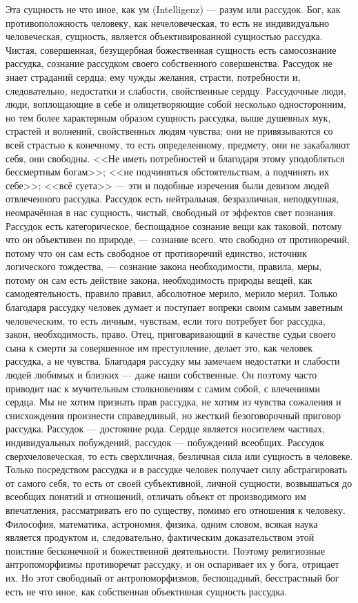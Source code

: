\documentclass[12pt,oneside]{book}
\begin{document}
Эта сущность не что иное, как ум (Intelligenz) --- разум или рассудок. Бог, как противоположность человеку, как нечеловеческая, то есть не индивидуально человеческая, сущность, является объективированной сущностью рассудка. Чистая, совершенная, безущербная божественная сущность есть самосознание рассудка, сознание рассудком своего собственного совершенства. Рассудок не знает страданий сердца; ему чужды желания, страсти, потребности и, следовательно, недостатки и слабости, свойственные сердцу. Рассудочные люди, люди, воплощающие в себе и олицетворяющие собой несколько односторонним, но тем более характерным образом сущность рассудка, выше душевных мук, страстей и волнений, свойственных людям чувства; они не привязываются со всей страстью к конечному, то есть определенному, предмету, они не закабаляют себя, они свободны. <<Не иметь потребностей и благодаря этому уподобляться бессмертным богам>>; <<не подчиняться обстоятельствам, а подчинять их себе>>; <<всё суета>> --- эти и подобные изречения были девизом людей отвлеченного рассудка. Рассудок есть нейтральная, безразличная, неподкупная, неомрачённая в нас сущность, чистый, свободный от эффектов свет познания. Рассудок есть категорическое, беспощадное сознание вещи как таковой, потому что он объективен по природе, --- сознание всего, что свободно от противоречий, потому что он сам есть свободное от противоречий единство, источник логического тождества, --- сознание закона необходимости, правила, меры, потому он сам есть действие закона, необходимость природы вещей, как самодеятельность, правило правил, абсолютное мерило, мерило мерил. Только благодаря рассудку человек думает и поступает вопреки своим самым заветным человеческим, то есть личным, чувствам, если того потребует бог рассудка, закон, необходимость, право. Отец, приговаривающий в качестве судьи своего сына к смерти за совершенное им преступление, делает это, как человек рассудка, а не чувства. Благодаря рассудку мы замечаем недостатки и слабости людей любимых и близких --- даже наши собственные. Он поэтому часто приводит нас к мучительным столкновениям с самим собой, с влечениями сердца. Мы не хотим признать прав рассудка, не хотим из чувства сожаления и снисхождения произнести справедливый, но жесткий безоговорочный приговор рассудка. Рассудок --- достояние рода. Сердце является носителем частных, индивидуальных побуждений, рассудок --- побуждений всеобщих. Рассудок сверхчеловеческая, то есть сверхличная, безличная сила или сущность в человеке. Только посредством рассудка и в рассудке человек получает силу абстрагировать от самого себя, то есть от своей субъективной, личной сущности, возвышаться до всеобщих понятий и отношений, отличать объект от производимого им впечатления, рассматривать его по существу, помимо его отношения к человеку. Философия, математика, астрономия, физика, одним словом, всякая наука является продуктом и, следовательно, фактическим доказательством этой поистине бесконечной и божественной деятельности. Поэтому религиозные антропоморфизмы противоречат рассудку, и он оспаривает их у бога, отрицает их. Но этот свободный от антропоморфизмов, беспощадный, бесстрастный бог есть не что иное, как собственная объективная сущность рассудка.
\end{document}
